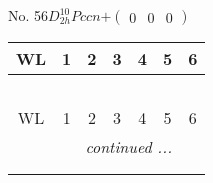 \documentclass[fleqn,9pt,landscape]{jsarticle}
\begin{document}
\newpage
No. 56\quad$D_{2h}^{10}$\quad$Pccn$\quad[ orthorhombic ]\quad$+\begin{pmatrix} 0 & 0 & 0 \end{pmatrix}$
\begin{center}
\renewcommand{\arraystretch}{1.2}
\begin{longtable}{ccccccc}
 \hline \hline
WL & 1 & 2 & 3 & 4 & 5 & 6 \\ \hline \endfirsthead

\multicolumn{6}{l}{\tablename\ \thetable{}} \\
 \hline \hline
WL & 1 & 2 & 3 & 4 & 5 & 6 \\ \hline \endhead

 \hline \hline
\multicolumn{6}{r}{\footnotesize\it continued ...} \\ \endfoot

 \hline \hline
\multicolumn{6}{r}{} \\ \endlastfoot


\end{longtable}
\end{center}
\end{document}
